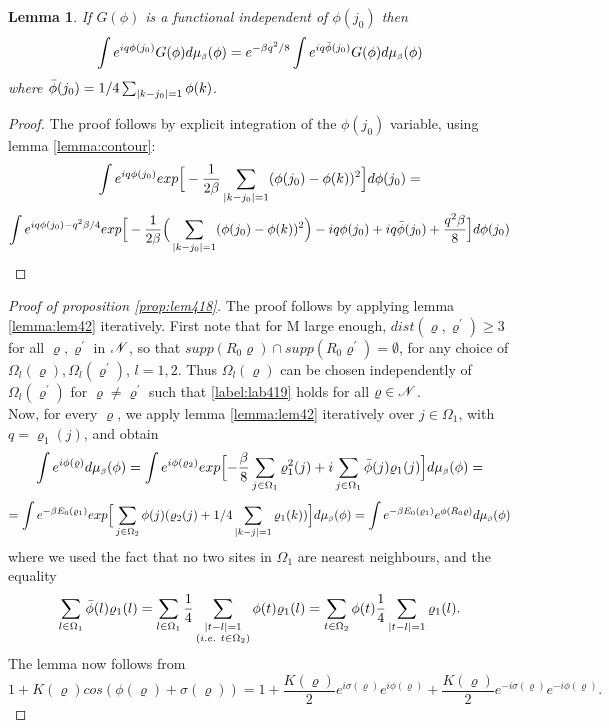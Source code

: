 \documentclass[11pt,reqno]{article}
\DeclarePairedDelimiter\abs{\lvert}{\rvert}%
\newtheorem{lemma}[thm]{Lemma}
\theoremstyle{definition}
\numberwithin{equation}{section}
\begin{document}
\begin{lemma} \label{lemma:lem42}
If $G(\phi)$ is a functional independent of $\phi(j_0)$ then
\begin{equation}
\int e^{i q \phi(j_0)} G(\phi)d\mu_{\text{\tiny$\beta$}}(\phi) = e^{-\beta q^2/8} \int e^{i q \bar{\phi}(j_0)} G(\phi)d\mu_{\text{\tiny$\beta$}}(\phi)
\end{equation}
where $\bar{\phi}(j_0)=1/4\sum_{\abs{k-j_0}=1} \phi(k)$.
\end{lemma}
\begin{proof}
The proof follows by explicit integration of the $\phi(j_0)$ variable, using lemma \eqref{lemma:contour}:
$$
\int e^{i q \phi(j_0)} exp \Big[ -\frac{1}{2\beta} \sum_{\abs{k-j_0}=1}(\phi(j_0)-\phi(k))^2 \Big] d\phi(j_0) =
$$
$$
\int e^{i q \phi(j_0) - q^2\beta/4} exp \Big[ -\frac{1}{2\beta} \Big( \sum_{\abs{k-j_0}=1}(\phi(j_0)-\phi(k))^2 \Big) - i q \phi(j_0) + iq\bar{\phi}(j_0) + \frac{q^2\beta}{8}\Big] d\phi(j_0)
$$
\end{proof}

\begin{proof}[Proof of proposition \eqref{prop:lem418}]
The proof follows by applying lemma \eqref{lemma:lem42} iteratively.
First note that for M large enough, $dist(\varrho, \varrho^\prime) \geq 3$ for all $\varrho, \varrho^\prime$ in $\mathscr{N}$, so that $supp(R_0\varrho) \cap supp(R_0\varrho^\prime) = \emptyset$, for any choice of $\Omega_l(\varrho), \Omega_l(\varrho^\prime)$, $l=1,2$. Thus $\Omega_l(\varrho)$ can be chosen independently of $\Omega_l(\varrho^\prime)$ for $\varrho \neq \varrho^\prime$ such that \eqref{label:lab419} holds for all $\varrho \in \mathscr{N}$.\\
Now, for every $\varrho$, we apply lemma \eqref{lemma:lem42} iteratively over $j \in \Omega_1$, with $q=\varrho_1(j)$, and obtain
$$
\int e^{i\phi(\varrho)}d\mu_{\text{\tiny$\beta$}}(\phi) = 
\int e^{i\phi(\varrho_2)}exp \Big[ {-\frac{\beta}{8}\sum_{j \in \Omega_1}\varrho_1^2(j)} + i\sum_{j \in \Omega_1} \bar{\phi}(j)\varrho_1(j)\Big] d\mu_{\text{\tiny$\beta$}}(\phi) = 
$$
$$
=\int e^{-\beta E_0(\varrho_1)} exp \Big[ \sum_{j \in \Omega_2}\phi(j) (\varrho_2(j) + 1/4\sum_{\abs{k-j}=1} \varrho_1(k) )\Big] \mida =
\int e^{-\beta E_0(\varrho_1)}e^{\phi(R_0\varrho)}\mida
$$
where we used the fact that no two sites in $\Omega_1$ are nearest neighbours, and the equality
$$
\sum_{l\in\Omega_1}\bar{\phi}(l)\varrho_1(l) = 
\sum_{l\in\Omega_1} \frac{1}{4} \sum_{\substack{\abs{t-l}=1 \\ (i.e.\ t\in \Omega_2)}} \phi(t)\varrho_1(l) = 
\sum_{t \in \Omega_2} \phi(t) \frac{1}{4} \sum_{\abs{t-l}=1} \varrho_1(l).
$$
The lemma now follows from 
$$
1+K(\varrho)cos(\phi(\varrho) + \sigma(\varrho)) = 
1 + 
\frac{K(\varrho)}{2}e^{i\sigma(\varrho)}e^{i\phi(\varrho)} + 
\frac{K(\varrho)}{2}e^{-i\sigma(\varrho)}e^{-i\phi(\varrho)}.
$$
\end{proof}
\end{document}

